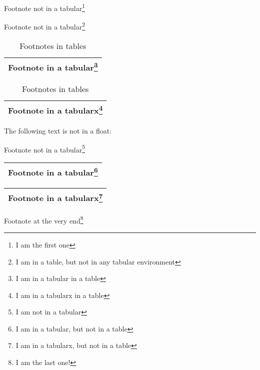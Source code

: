 

  Footnote not in a tabular\footnote{I am the first one}


\begin{table}[h]
  Footnote not in a tabular\footnote{I am  in a table, but not in any tabular environment}

  \begin{tabular}{|l|}
  \hline
    Footnote  in a tabular\footnote{I am in a tabular in a table}\\
  \hline
  \end{tabular}

  \begin{tabularx}{\textwidth}{|l|}
  \hline
    Footnote  in a tabularx\footnote{I am in a tabularx in a table}\\
  \hline
  \end{tabularx}
  \caption{Footnotes in tables}
\end{table}

The following text is not in a float:

Footnote not in a tabular\footnote{I am not in a tabular}

\begin{tabular}{|l|}
\hline
Footnote  in a tabular\footnote{I am in a tabular, but not in a table}\\
\hline
\end{tabular}

\begin{tabularx}{\textwidth}{|l|}
\hline
Footnote  in a tabularx\footnote{I am in a tabularx, but not in a table}\\
\hline
\end{tabularx}

  Footnote at the very end\footnote{I am the last one!}
  \newpage
